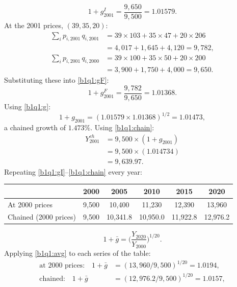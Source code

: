 \begin{sol}
\[
1+g^I_{2001}=\frac{9{,}650}{9{,}500}=1.01579 .
\]
At the 2001 prices, $(39,35,20)$:
\begin{align*}
\textstyle\sum_i p_{i,2001}\,q_{i,2001}&=39\times103+35\times47+20\times206\\
&=4{,}017+1{,}645+4{,}120=9{,}782,\\
\textstyle\sum_i p_{i,2001}\,q_{i,2000}&=39\times100+35\times50+20\times200\\
&=3{,}900+1{,}750+4{,}000=9{,}650.
\end{align*}
Substituting these into \eqref{b1q1:gF}:
\[
1+g^F_{2001}=\frac{9{,}782}{9{,}650}=1.01368 .
\]
Using \eqref{b1q1:g}:
\[
1+g_{2001}=(1.01579\times1.01368)^{1/2}=1.01473 ,
\]
a chained growth of $1.473\%$. Using \eqref{b1q1:chain}:
\begin{align*}
Y^{ch}_{2001}&=9{,}500\times(1+g_{2001})\\
&=9{,}500\times(1.014734)\\
&=9{,}639.97 .
\end{align*}
Repeating \eqref{b1q1:gI}--\eqref{b1q1:chain} every year:
\begin{center}\small
\begin{tabular}{@{}lccccc@{}}
\toprule
 & 2000 & 2005 & 2010 & 2015 & 2020 \\
\midrule
At 2000 prices & 9{,}500 & 10{,}400 & 11{,}230 & 12{,}390 & 13{,}960 \\
Chained (2000 prices) & 9{,}500 & 10{,}341.8 & 10{,}950.0 & 11{,}922.8 & 12{,}976.2 \\
\bottomrule
\end{tabular}
\end{center}
\begin{equation}
1+\bar g=\Big(\frac{Y_{2020}}{Y_{2000}}\Big)^{1/20}. \label{b1q1:avg}
\end{equation}
Applying \eqref{b1q1:avg} to each series of the table:
\begin{align*}
\text{at 2000 prices:}\quad 1+\bar g&=(13{,}960/9{,}500)^{1/20}=1.0194,\\
\text{chained:}\quad 1+\bar g&=(12{,}976.2/9{,}500)^{1/20}=1.0157,

\end{align*}
\end{sol}
